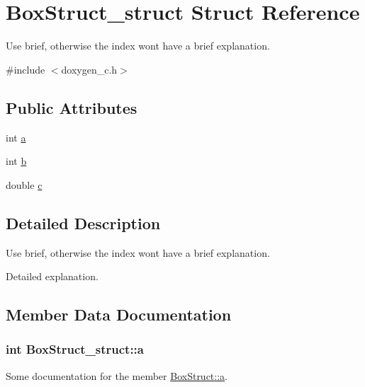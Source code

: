 \hypertarget{structBoxStruct__struct}{}\section{Box\+Struct\+\_\+struct Struct Reference}
\label{structBoxStruct__struct}


Use brief, otherwise the index won\textquotesingle{}t have a brief explanation.  




{\ttfamily \#include $<$doxygen\+\_\+c.\+h$>$}

\subsection*{Public Attributes}
\begin{DoxyCompactItemize}
\item 
int \hyperlink{structBoxStruct__struct_a4593938c5e90f024e7971bdb1392d9d6}{a}
\item 
int \hyperlink{structBoxStruct__struct_aee44748dc579c5d794853ee8b133d197}{b}
\item 
double \hyperlink{structBoxStruct__struct_a4543370ed67b2cf5ae3f55201bea11e6}{c}
\end{DoxyCompactItemize}


\subsection{Detailed Description}
Use brief, otherwise the index won\textquotesingle{}t have a brief explanation. 

Detailed explanation. 

\subsection{Member Data Documentation}
\hypertarget{structBoxStruct__struct_a4593938c5e90f024e7971bdb1392d9d6}{}
\subsubsection[{a}]{\setlength{\rightskip}{0pt plus 5cm}int Box\+Struct\+\_\+struct\+::a}\label{structBoxStruct__struct_a4593938c5e90f024e7971bdb1392d9d6}
Some documentation for the member \hyperlink{structBoxStruct__struct_a4593938c5e90f024e7971bdb1392d9d6}{Box\+Struct\+::a}. \hypertarget{structBoxStruct__struct_aee44748dc579c5d794853ee8b133d197}{}
